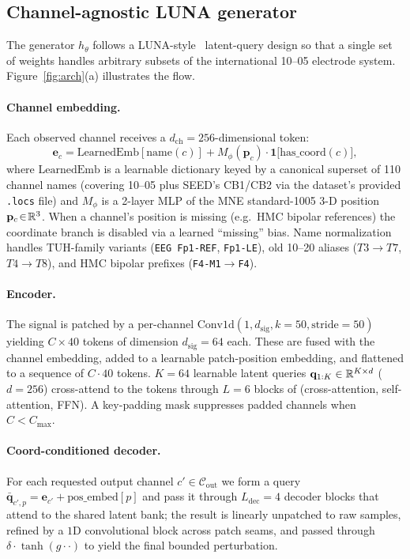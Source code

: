 \subsection{Channel-agnostic LUNA generator}
\label{sec:generator}

The generator $h_\theta$ follows a LUNA-style~\citep{luna} latent-query design so that a single set of weights handles arbitrary subsets of the international 10--05 electrode system. Figure~\ref{fig:arch}(a) illustrates the flow.

\paragraph{Channel embedding.} Each observed channel receives a $d_{\text{ch}}\!=\!256$-dimensional token:
\begin{equation}
\mathbf{e}_c = \mathrm{LearnedEmb}[\mathrm{name}(c)] + M_\phi(\mathbf{p}_c)\cdot \mathbf{1}\!\bigl[\mathrm{has\_coord}(c)\bigr],
\end{equation}
where $\mathrm{LearnedEmb}$ is a learnable dictionary keyed by a canonical superset of 110 channel names (covering 10--05 plus SEED's CB1/CB2 via the dataset's provided \texttt{.locs} file) and $M_\phi$ is a 2-layer MLP of the MNE standard-1005 3-D position $\mathbf{p}_c\!\in\!\mathbb{R}^3$. When a channel's position is missing (e.g.\ HMC bipolar references) the coordinate branch is disabled via a learned ``missing'' bias. Name normalization handles TUH-family variants (\texttt{EEG Fp1-REF}, \texttt{Fp1-LE}), old 10--20 aliases ($T3\!\to\!T7$, $T4\!\to\!T8$), and HMC bipolar prefixes (\texttt{F4-M1}$\to$\texttt{F4}).

\paragraph{Encoder.} The signal is patched by a per-channel $\mathrm{Conv1d}(1,d_{\text{sig}},k{=}50,\mathrm{stride}{=}50)$ yielding $C\!\times\!40$ tokens of dimension $d_{\text{sig}}\!=\!64$ each. These are fused with the channel embedding, added to a learnable patch-position embedding, and flattened to a sequence of $C\cdot 40$ tokens. $K\!=\!64$ learnable latent queries $\mathbf{q}_{1:K}\in\mathbb{R}^{K\times d}$ ($d\!=\!256$) cross-attend to the tokens through $L\!=\!6$ blocks of (cross-attention, self-attention, FFN). A key-padding mask suppresses padded channels when $C\!<\!C_{\max}$.

\paragraph{Coord-conditioned decoder.} For each requested output channel $c'\in\mathcal{C}_{\text{out}}$ we form a query $\bar{\mathbf{q}}_{c',p}\!=\!\mathbf{e}_{c'}+\mathrm{pos\_embed}[p]$ and pass it through $L_{\text{dec}}\!=\!4$ decoder blocks that attend to the shared latent bank; the result is linearly unpatched to raw samples, refined by a $1$D convolutional block across patch seams, and passed through $\delta\cdot\tanh(g\cdot\cdot)$ to yield the final bounded perturbation.

